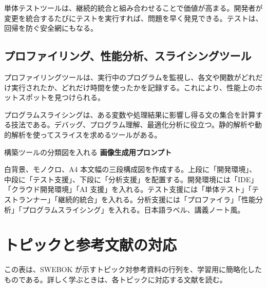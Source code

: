 \documentclass[a4paper,11pt,ja=standard,xelatex]{bxjsarticle}
\begin{document}
単体テストツールは、継続的統合と組み合わせることで価値が高まる。開発者が変更を統合するたびにテストを実行すれば、問題を早く発見できる。テストは、回帰を防ぐ安全網にもなる。

\subsection{プロファイリング、性能分析、スライシングツール}

プロファイリングツールは、実行中のプログラムを監視し、各文や関数がどれだけ実行されたか、どれだけ時間を使ったかを記録する。これにより、性能上のホットスポットを見つけられる。

プログラムスライシングは、ある変数や処理結果に影響し得る文の集合を計算する技法である。デバッグ、プログラム理解、最適化分析に役立つ。静的解析や動的解析を使ってスライスを求めるツールがある。

\begin{todobox}{構築ツールの分類図を入れる}
\textbf{画像生成用プロンプト}

白背景、モノクロ、A4 本文幅の三段構成図を作成する。上段に「開発環境」、中段に「テスト支援」、下段に「分析支援」を配置する。開発環境には「IDE」「クラウド開発環境」「AI 支援」を入れる。テスト支援には「単体テスト」「テストランナー」「継続的統合」を入れる。分析支援には「プロファイラ」「性能分析」「プログラムスライシング」を入れる。日本語ラベル、講義ノート風。
\end{todobox}

\section{トピックと参考文献の対応}

この表は、SWEBOK が示すトピック対参考資料の行列を、学習用に簡略化したものである。詳しく学ぶときは、各トピックに対応する文献を読む。
\end{document}
